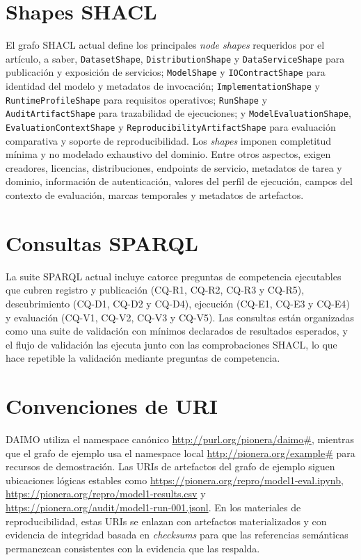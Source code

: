 \documentclass[11pt,a4paper]{article}
\newcommand{\code}[1]{\texttt{#1}}
\newcommand{\cq}[1]{\textsf{#1}}
\begin{document}
\section{Shapes SHACL}

El grafo SHACL actual define los principales \emph{node shapes} requeridos por el artículo, a saber, \code{DatasetShape}, \code{DistributionShape} y \code{DataServiceShape} para publicación y exposición de servicios; \code{ModelShape} y \code{IOContractShape} para identidad del modelo y metadatos de invocación; \code{ImplementationShape} y \code{RuntimeProfileShape} para requisitos operativos; \code{RunShape} y \code{AuditArtifactShape} para trazabilidad de ejecuciones; y \code{ModelEvaluationShape}, \code{EvaluationContextShape} y \code{ReproducibilityArtifactShape} para evaluación comparativa y soporte de reproducibilidad. Los \emph{shapes} imponen completitud mínima y no modelado exhaustivo del dominio. Entre otros aspectos, exigen creadores, licencias, distribuciones, endpoints de servicio, metadatos de tarea y dominio, información de autenticación, valores del perfil de ejecución, campos del contexto de evaluación, marcas temporales y metadatos de artefactos.

\section{Consultas SPARQL}

La suite SPARQL actual incluye catorce preguntas de competencia ejecutables que cubren registro y publicación (\cq{CQ-R1}, \cq{CQ-R2}, \cq{CQ-R3} y \cq{CQ-R5}), descubrimiento (\cq{CQ-D1}, \cq{CQ-D2} y \cq{CQ-D4}), ejecución (\cq{CQ-E1}, \cq{CQ-E3} y \cq{CQ-E4}) y evaluación (\cq{CQ-V1}, \cq{CQ-V2}, \cq{CQ-V3} y \cq{CQ-V5}). Las consultas están organizadas como una suite de validación con mínimos declarados de resultados esperados, y el flujo de validación las ejecuta junto con las comprobaciones SHACL, lo que hace repetible la validación mediante preguntas de competencia.

\section{Convenciones de URI}

DAIMO utiliza el namespace canónico \url{http://purl.org/pionera/daimo#}, mientras que el grafo de ejemplo usa el namespace local \url{http://pionera.org/example#} para recursos de demostración. Las URIs de artefactos del grafo de ejemplo siguen ubicaciones lógicas estables como \url{https://pionera.org/repro/model1-eval.ipynb}, \url{https://pionera.org/repro/model1-results.csv} y \url{https://pionera.org/audit/model1-run-001.jsonl}. En los materiales de reproducibilidad, estas URIs se enlazan con artefactos materializados y con evidencia de integridad basada en \emph{checksums} para que las referencias semánticas permanezcan consistentes con la evidencia que las respalda.
\end{document}
